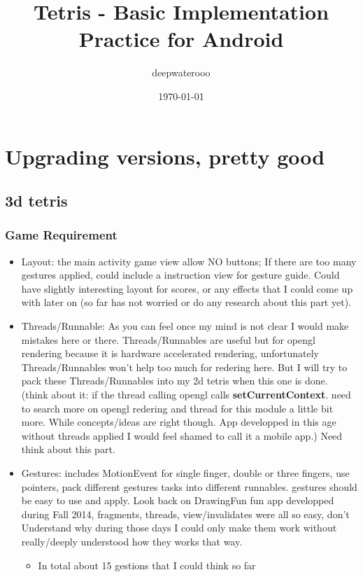 \documentclass[9pt,b5paper]{article}
\author{deepwaterooo}
\date{\today}
\title{Tetris - Basic Implementation Practice for Android}
\begin{document}
\maketitle
\tableofcontents


\section{Upgrading versions, pretty good}
\label{sec-1}
\subsection{3d tetris}
\label{sec-1-1}
\subsubsection{Game Requirement}
\label{sec-1-1-1}
\begin{itemize}
\item Layout: the main activity game view allow NO buttons; If there are too many gestures applied, could include a instruction view for gesture guide. Could have slightly interesting layout for scores, or any effects that I could come up with later on (so far has not worried or do any research about this part yet).
\item Threads/Runnable: As you can feel once my mind is not clear I would make mistakes here or there. Threads/Runnables are useful but for opengl rendering because it is hardware accelerated rendering, unfortunately Threads/Runnables won't help too much for redering here. But I will try to pack these Threads/Runnables into my 2d tetris when this one is done. (think about it: if the thread calling opengl calls \textbf{setCurrentContext}. need to search more on opengl redering and thread for this module a little bit more. While concepts/ideas are right though. App developped in this age without threads applied I would feel shamed to call it a mobile app.) Need think about this part.
\item Gestures: includes MotionEvent for single finger, double or three fingers, use pointers, pack different gestures tasks into different runnables. gestures should be easy to use and apply. Look back on DrawingFun fun app developped during Fall 2014, fragments, threads, view/invalidates were all so easy, don't Understand why during those days I could only make them work without really/deeply understood how they works that way. 
\begin{itemize}
\item In total about 15 gestions that I could think so far

\end{itemize}
\end{itemize}
\end{document}

